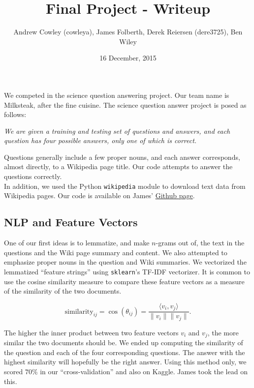 \documentclass{article}
\title{Final Project - Writeup}
\date{16 December, 2015}
\author{Andrew Cowley (cowleya), James Folberth, Derek Reiersen (dere3725), Ben Wiley}
\theoremstyle{mystuff}
\theoremstyle{myexample}
\theoremstyle{named}
\begin{document}
\maketitle

We competed in the science question answering project.  Our team name is Milksteak, after the fine cuisine. The science question answer project is posed as follows: 

    \begin{center}
        \textit{We are given a training and testing set of questions and answers, and each question has four possible answers, only one of which is correct.}
    \end{center}

Questions generally include a few proper nouns, and each answer corresponds, almost directly, to a Wikipedia page title.  Our code attempts to answer the questions correctly. \\

In addition, we used the Python \texttt{wikipedia} module to download text data from Wikipedia pages.  Our code is available on James' \href{https://github.com/jamesfolberth/ml_project}{Github page}.\\

\subsection{NLP and Feature Vectors}
\label{ssec:nlp}
One of our first ideas is to lemmatize, and make $n$-grams out of, the text in the questions and the Wiki page summary and content.  We also attempted to emphasize proper nouns in the question and Wiki summaries.  We vectorized the lemmatized ``feature strings'' using \texttt{sklearn}'s TF-IDF vectorizer.  It is common to use the cosine similarity measure to compare these feature vectors as a measure of the similarity of the two documents.

\[ \text{similarity}_{ij} = \cos(\theta_{ij}) = \dfrac{\langle v_i, v_j\rangle}{\|v_i\|\|v_j\|}. \] 

\noindent The higher the inner product between two feature vectors $v_i$ and $v_j$, the more similar the two documents should be.  We ended up computing the similarity of the question and each of the four corresponding questions.  The answer with the highest similarity will hopefully be the right answer.  Using this method only, we scored $70\%$ in our ``cross-validation'' and also on Kaggle.  James took the lead on this.\\
\end{document}
